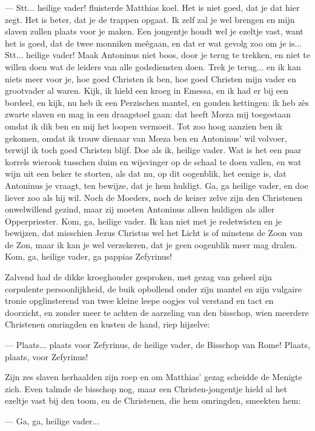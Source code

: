 \documentclass[a4paper, 12pt, oneside, dutch]{article}
\begin{document}
--- Stt... heilige vader! fluisterde Matthias koel. Het is niet goed, dat je dat hier zegt. Het is beter, dat je de trappen opgaat. Ik zelf zal je wel brengen en mijn slaven zullen plaats voor je maken. Een jongentje houdt wel je ezeltje vast, want het is goed, dat de twee monniken meêgaan, en dat er wat gevolg zoo om je is... Stt... heilige vader! Maak Antoninus niet boos, door je terug te trekken, en niet te willen doen wat de leiders van alle godsdiensten doen. Trek je terug... en ik kan niets meer voor je, hoe goed Christen ik ben, hoe goed Christen mijn vader en grootvader al waren. Kijk, ik hield een kroeg in Emessa, en ik had er bij een bordeel, en kijk, nu heb ik een Perzischen mantel, en gouden kettingen: ik heb zès zwarte slaven en mag in een draagstoel gaan: dat heeft Mœza mij toegestaan omdat ik dik ben en mij het loopen vermoeit. Tot zoo hoog aanzien ben ik gekomen, omdat ik trouw dienaar van Mœza ben en Antoninus' wil volvoer, terwijl ik toch goed Christen blijf. Doe als ik, heilige vader. Wat is het een paar korrels wierook tusschen duim en wijsvinger op de schaal te doen vallen, en wat wijn uit een beker te storten, als dat nu, op dit oogenblik, het eenige is, dat Antoninus je vraagt, ten bewijze, dat je hem huldigt. Ga, ga heilige vader, en doe liever zoo als hij wil. Noch de Moeders, noch de keizer zelve zijn den Christenen onwelwillend gezind, maar zij moeten Antoninus alleen huldigen als aller Opperpriester. Kom, ga, heilige vader. Ik kan niet met je redetwisten en je bewijzen, dat misschien Jezus Christus wel het Licht is of minstens de Zoon van de Zon, maar ik kan je wel verzekeren, dat je geen oogenblik meer mag dralen. Kom, ga, heilige vader, ga pappias Zefyrinus!

Zalvend had de dikke kroeghouder gesproken, met gezag van geheel zijn corpulente persoonlijkheid, de buik opbollend onder zijn mantel en zijn vulgaire tronie opglinsterend van twee kleine leepe oogjes vol verstand en tact en doorzicht, en zonder meer te achten de aarzeling van den bisschop, wien meerdere Christenen omringden en kusten de hand, riep hijzelve:

--- Plaats... plaats voor Zefyrinus, de heilige vader, de Bisschop van Rome! Plaats, plaats, voor Zefyrinus!

Zijn zes slaven herhaalden zijn roep en om Matthias' gezag scheidde de Menigte zich. Even talmde de bisschop nog, maar een Christen-jongentje hield al het ezeltje vast bij den toom, en de Christenen, die hem omringden, smeekten hem:

--- Ga, ga, heilige vader...
\end{document}
